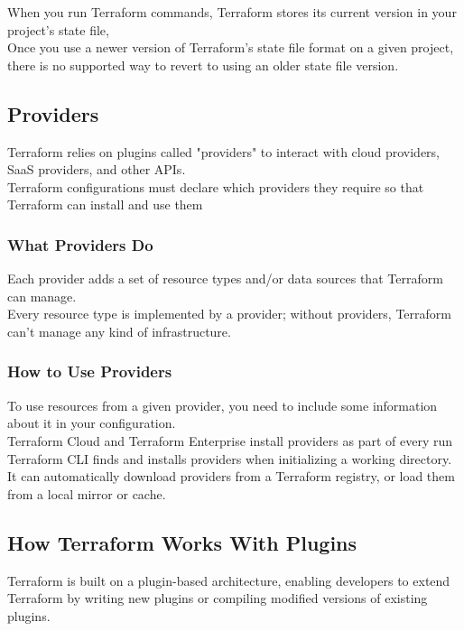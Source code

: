 \documentclass[12pt, letterpaper, twoside]{article}
\begin{document}
When you run Terraform commands, Terraform stores its current version in your 
project's state file,\\

Once you use a newer version of Terraform's state file format on a given project, 
there is no supported way to revert to using an older state file version.\\

\subsection{Providers}
Terraform relies on plugins called "providers" to interact with cloud providers, 
SaaS providers, and other APIs.\\

Terraform configurations must declare which providers they require so that 
Terraform can install and use them

\subsubsection{What Providers Do}
Each provider adds a set of resource types and/or data sources that Terraform 
can manage.\\

Every resource type is implemented by a provider; without providers, Terraform 
can't manage any kind of infrastructure.\\

\subsubsection{How to Use Providers}
To use resources from a given provider, you need to include some information about it 
in your configuration.\\
Terraform Cloud and Terraform Enterprise install providers as part of every run\\
Terraform CLI finds and installs providers when initializing a working directory. 
It can automatically download providers from a Terraform registry, or load them from a 
local mirror or cache.\\

\subsection{How Terraform Works With Plugins}
Terraform is built on a plugin-based architecture, enabling developers to extend 
Terraform by writing new plugins or compiling modified versions of existing plugins.
\end{document}
